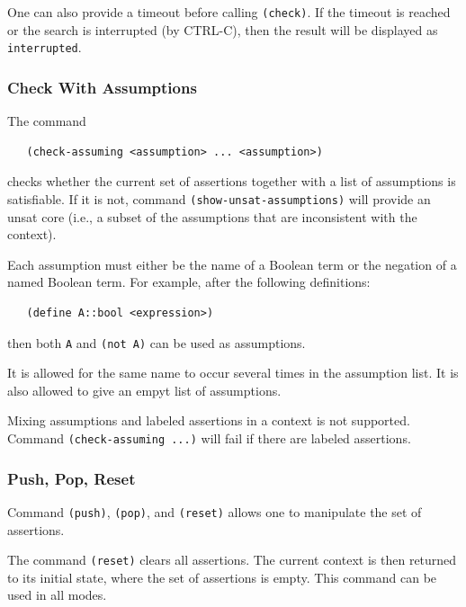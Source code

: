 \documentclass[11pt,twoside,fleqn,openright,titlepage]{cslreport}
\begin{document}
\medskip\noindent One can also provide a timeout before calling
\texttt{(check)}. If the timeout is reached or the search is
interrupted (by CTRL-C), then the result will be displayed as
\texttt{interrupted}.

\subsubsection*{Check With Assumptions}

The command
\begin{small}
\begin{verbatim}
   (check-assuming <assumption> ... <assumption>)
\end{verbatim}
\end{small}
checks whether the current set of assertions together with a list of
assumptions is satisfiable. If it is not, command
\texttt{(show-unsat-assumptions)} will provide an unsat core (i.e., a
subset of the assumptions that are inconsistent with the context).

\medskip\noindent
Each assumption must either be the name of a Boolean term or the
negation of a named Boolean term.  For example, after the following
definitions:
\begin{small}
\begin{verbatim}
   (define A::bool <expression>)
\end{verbatim}
\end{small}
then both \texttt{A} and \texttt{(not A)} can be used as assumptions.

\medskip\noindent
It is allowed for the same name to occur several times in the
assumption list. It is also allowed to give an empyt list of
assumptions.

\medskip\noindent
Mixing assumptions and labeled assertions in a context is not
supported. Command \texttt{(check-assuming ...)} will fail if there
are labeled assertions.

\subsubsection*{Push, Pop, Reset}

Command \texttt{(push)}, \texttt{(pop)}, and \texttt{(reset)} allows
one to manipulate the set of assertions.

\medskip\noindent
The command \texttt{(reset)} clears all assertions. The current
context is then returned to its initial state, where the set of
assertions is empty. This command can be used in all modes.
\end{document}
